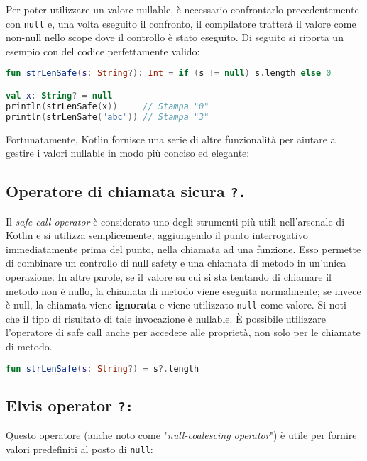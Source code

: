 Per poter utilizzare un valore nullable, è necessario confrontarlo precedentemente con \texttt{null} e, una volta eseguito il confronto, il compilatore tratterà il valore come non-null nello scope dove il controllo è stato eseguito. Di seguito si riporta un esempio con del codice perfettamente valido:\\

\begin{lstlisting}[caption={Aggirare i valori \texttt{null} grazie alla nullability}, captionpos=b, label={lst:exampleNullKtElse}, language=Kotlin]
fun strLenSafe(s: String?): Int = if (s != null) s.length else 0

val x: String? = null
println(strLenSafe(x))     // Stampa "0"
println(strLenSafe("abc")) // Stampa "3"
\end{lstlisting}

Fortunatamente, Kotlin fornisce una serie di altre funzionalità per aiutare a gestire i valori nullable in modo più conciso ed elegante:\\

\subsection{Operatore di chiamata sicura {\bfseries \texttt{?.}}}
Il {\em safe call operator} è considerato uno degli strumenti più utili nell'arsenale di Kotlin e si utilizza semplicemente, aggiungendo il punto interrogativo immediatamente prima del punto, nella chiamata ad una funzione. Esso permette di combinare un controllo di null safety e una chiamata di metodo in un'unica operazione. In altre parole, se il valore su cui si sta tentando di chiamare il metodo non è nullo, la chiamata di metodo viene eseguita normalmente; se invece è null, la chiamata viene {\bfseries ignorata} e viene utilizzato \texttt{null} come valore. Si noti che il tipo di risultato di tale invocazione è nullable. È possibile utilizzare l'operatore di safe call anche per accedere alle proprietà, non solo per le chiamate di metodo.\\

\begin{lstlisting}[caption={Utilizzo di safe call operator}, captionpos=b, label={lst:exampleSafeCall}, language=Kotlin]
fun strLenSafe(s: String?) = s?.length
\end{lstlisting}

\subsection{Elvis operator {\bfseries \texttt{?:}}}
Questo operatore (anche noto come "{\em null-coalescing operator}") è utile per fornire valori predefiniti al posto di \texttt{null}:\\

